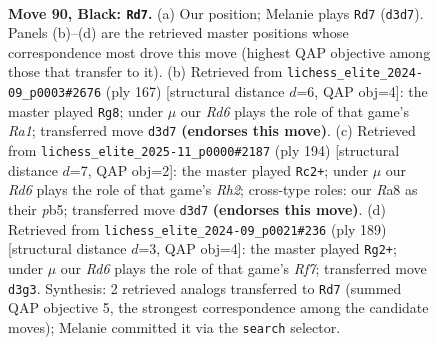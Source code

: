 \documentclass[11pt]{article}
\begin{document}
\clearpage

\begin{figure}[p]\centering
\begin{subfigure}{0.46\textwidth}\centering
\resizebox{\linewidth}{!}{%
\newchessgame
\chessboard[
  setfen={r7/2k5/8/5RK1/7P/3r4/8/8 b - - 22 90},
  showmover=false,
  pgfstyle=straightmove, color=movearrow, markmove={d3-d7}
]}
\caption{}
\end{subfigure}\hfill
\begin{subfigure}{0.46\textwidth}\centering
\resizebox{\linewidth}{!}{%
\newchessgame
\chessboard[
  setfen={r6k/8/4RK2/6P1/8/8/8/8 b - - 22 84},
  showmover=false,
  pgfstyle=straightmove, color=movearrow, markmove={a8-g8}
]}
\caption{}
\end{subfigure}
\\[4pt]
\begin{subfigure}{0.46\textwidth}\centering
\resizebox{\linewidth}{!}{%
\newchessgame
\chessboard[
  setfen={8/8/8/1p6/3p4/2k3r1/7R/2K5 w - - 4 98},
  showmover=false,
  pgfstyle=straightmove, color=movearrow, markmove={h2-c2}
]}
\caption{}
\end{subfigure}\hfill
\begin{subfigure}{0.46\textwidth}\centering
\resizebox{\linewidth}{!}{%
\newchessgame
\chessboard[
  setfen={6R1/6K1/7P/4k3/8/8/5r2/8 b - - 20 95},
  showmover=false,
  pgfstyle=straightmove, color=movearrow, markmove={f2-g2}
]}
\caption{}
\end{subfigure}
\caption{\textbf{Move 90, Black: \texttt{Rd7}.} (a) Our position; Melanie plays \texttt{Rd7} (\texttt{d3d7}). Panels (b)--(d) are the retrieved master positions whose correspondence most drove this move (highest QAP objective among those that transfer to it). (b) Retrieved from \texttt{lichess\_elite\_2024-09\_p0003\#2676} (ply 167) [structural distance $d$=6, QAP obj=4]: the master played \texttt{Rg8}; under $\mu$ our \emph{Rd6} plays the role of that game's \emph{Ra1}; transferred move \texttt{d3d7} \textbf{(endorses this move)}. (c) Retrieved from \texttt{lichess\_elite\_2025-11\_p0000\#2187} (ply 194) [structural distance $d$=7, QAP obj=2]: the master played \texttt{Rc2+}; under $\mu$ our \emph{Rd6} plays the role of that game's \emph{Rh2}; cross-type roles: our \emph{R}a8 as their \emph{p}b5; transferred move \texttt{d3d7} \textbf{(endorses this move)}. (d) Retrieved from \texttt{lichess\_elite\_2024-09\_p0021\#236} (ply 189) [structural distance $d$=3, QAP obj=4]: the master played \texttt{Rg2+}; under $\mu$ our \emph{Rd6} plays the role of that game's \emph{Rf7}; transferred move \texttt{d3g3}. Synthesis: 2 retrieved analogs transferred to \texttt{Rd7} (summed QAP objective 5, the strongest correspondence among the candidate moves); Melanie committed it via the \texttt{search} selector.}
\label{fig:thought-m179}
\end{figure}
\end{document}
